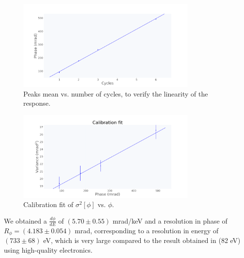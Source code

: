 \documentclass[12pt]{article}
\begin{document}
\begin{figure}[H]
\centering
\includegraphics[width=0.8\textwidth]{calib_cycles_vs_phase.png}
\caption{Peaks mean vs. number of cycles, to verify the linearity of the response.}
\end{figure}
\begin{figure}[H]
\centering
\includegraphics[width=0.8\textwidth]{calib_fit.png}
\caption{Calibration fit of $\sigma^2[\phi]$ vs. $\phi$.}
\end{figure}
We obtained a $\frac{d \phi}{dE}$ of $( 5.70 \pm 0.55)$ mrad/keV and a resolution in phase of $R_\phi = (4.183 \pm 0.054)$ mrad, corresponding to a resolution in energy of $(733 \pm 68)$ eV, which is very large compared to the result obtained in \cite{Cardani} (82 eV) using high-quality electronics.
\end{document}
